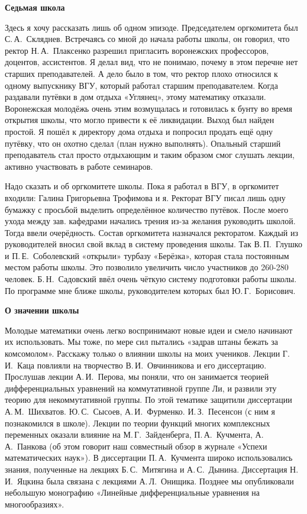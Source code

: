 {\bf Седьмая школа}

Здесь я хочу рассказать лишь об одном эпизоде.
Председателем оргкомитета был С.\,А.~Скляднев.
Встречаясь со мной до начала работы школы, он говорил,
что ректор
\linebreak
Н.\,А.~Плаксенко разрешил пригласить воронежских профессоров, доцентов, ассистентов.
Я делал вид, что не понимаю, почему в этом перечне нет старших преподавателей. А дело было в том, что ректор плохо относился к одному выпускнику ВГУ, который работал старшим преподавателем. Когда раздавали путёвки в дом отдыха «Углянец», этому математику отказали. Воронежская молодёжь очень этим возмущалась и готовилась к бунту во время открытия школы, что могло привести к её ликвидации. Выход был найден простой. Я пошёл к директору дома отдыха и попросил продать ещё одну путёвку, что он охотно сделал (план нужно выполнять). Опальный старший преподаватель стал просто отдыхающим и таким образом смог слушать лекции, активно участвовать в работе семинаров.

Надо сказать и об оргкомитете школы. Пока я работал в ВГУ, в оргкомитет входили: Галина Григорьевна Трофимова и я. Ректорат ВГУ писал лишь одну бумажку с просьбой выделить определённое количество путёвок. После моего ухода между зав. кафедрами начались трения из-за желания руководить школой. Тогда ввели очерёдность. Состав оргкомитета назначался ректоратом. Каждый из руководителей вносил свой вклад в систему проведения школы. Так В.\,П.~Глушко и П.\,Е.~Соболевский «открыли» турбазу «Берёзка», которая стала постоянным местом работы школы. Это позволило увеличить число участников до 260-280 человек. Б.\,Н.~Садовский ввёл очень чёткую систему подготовки работы школы. По программе мне ближе школы, руководителем которых был Ю.\,Г.~Борисович.

{\bf О значении школы}

Молодые математики очень легко воспринимают новые идеи и смело начинают их использовать.
Мы тоже, по мере сил пытались «задрав штаны бежать за комсомолом». Расскажу только о влиянии школы на моих учеников.
Лекции Г.\,И.~Каца повлияли на творчество В.\,И.~Овчинникова и его диссертацию.
Прослушав лекции А.\,И.~Перова, мы поняли, что он занимается теорией дифференциальных уравнений на коммутативной группе Ли,
и развили эту теорию для некоммутативной группы.
По этой тематике защитили диссертации А.\,М.~Шихватов. Ю.\,С.~Сысоев, А.\,И.~Фурменко. И.\,З.~Песенсон (с ним я познакомился в школе).
Лекции по теории функций многих комплексных переменных оказали влияние на М.\,Г.~Зайденберга, П.\,А.~Кучмента, А.\,А.~Панкова
(об этом говорит наш совместный обзор в журнале «Успехи математических наук»).
В диссертации П.\,А.~Кучмента широко использовались знания, полученные на лекциях Б.\,С.~Ми\-тя\-ги\-на и А.\,С.~Дынина. Диссертация Н.\,И.~Яцкина была связана с лекциями А.\,Л.~Онищика. Позднее мы опубликовали небольшую монографию «Линейные дифференциальные уравнения на многообразиях».

